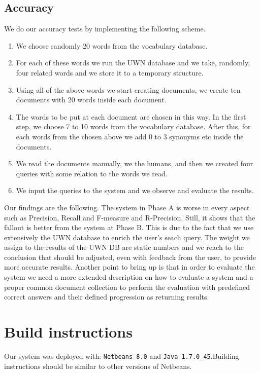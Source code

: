 \documentclass[letterpaper,10pt]{article}
\begin{document}
\subsection{ Accuracy }
We do our accuracy tests by implementing the following scheme. 
\begin{enumerate}
\item We choose randomly 20 words from the vocabulary database.
\item For each of these words we run the UWN database and we take, randomly,
four related words and we store it to a temporary structure. 
\item Using all of the above words we start creating documents, we create 
ten documents with 20 words inside each document.
\item The words to be put at each document are chosen in this way. In the 
first step, we choose 7 to 10 words from the vocabulary database. After this,
for each words from the chosen above we add 0 to 3 synonyms etc inside the 
documents.
\item We read the documents manually, we the humans, and then we created 
four queries with some relation to the words we read.
\item We input the queries to the system and we observe and evaluate the
results.
\end{enumerate}

Our findings are the following. The system in Phase A is worse in every aspect
such as Precision, Recall and F-measure and R-Precision. Still, it shows that 
the fallout is better from the system at Phase B. This is due to the fact that
we use extensively the UWN database to enrich the user's seach query. The 
weight we assign to the results of the UWN DB are static numbers and we reach 
to the conclusion that should be adjusted, even with feedback from the user, 
to provide more accurate results. Another point to bring up is that in order to
evaluate the system we need a more extended description on how to evaluate a
system and a proper common document collection to perform the evaluation with
predefined correct answers and their defined progression as returning results.


\section{Build instructions}
Our system was deployed with: {\tt Netbeans 8.0} and {\tt Java 1.7.0\_45}.Building instructions should be similar to other versions of Netbeans.
\end{document}
